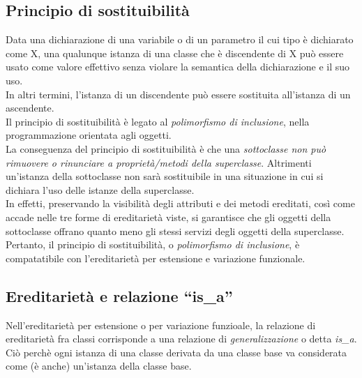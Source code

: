\documentclass[12pt]{report}
\begin{document}
\subsection{Principio di sostituibilità}
Data una dichiarazione di una variabile o di un parametro il cui tipo è dichiarato come X, una qualunque istanza di una classe che è discendente di X può essere usato come valore effettivo senza violare la semantica della dichiarazione e il suo uso. \\
In altri termini, l'istanza di un discendente può essere sostituita all'istanza di un ascendente. \\
Il principio di sostituibilità è legato al \textit{polimorfismo di inclusione}, nella programmazione orientata agli oggetti. \\
La conseguenza del principio di sostituibilità è che una \textit{sottoclasse non può rimuovere o rinunciare a proprietà/metodi della superclasse}. Altrimenti un'istanza della sottoclasse non sarà sostituibile in una situazione in cui si dichiara l'uso delle istanze della superclasse. \\
In effetti, preservando la visibilità degli attributi e dei metodi ereditati, così come accade nelle tre forme di ereditarietà viste, si garantisce che gli oggetti della sottoclasse offrano quanto meno gli stessi servizi degli oggetti della superclasse. \\
Pertanto, il principio di sostituibilità, o \textit{polimorfismo di inclusione}, è compatatibile con l'ereditarietà per estensione e variazione funzionale.
\subsection{Ereditarietà e relazione ``is\_a''}
Nell'ereditarietà per estensione o per variazione funzioale, la relazione di ereditarietà fra classi corrisponde a una relazione di \textit{generalizzazione} o detta \textit{is\_a}. Ciò perchè ogni istanza di una classe derivata da una classe base va considerata come (è anche) un'istanza della classe base.
\end{document}
